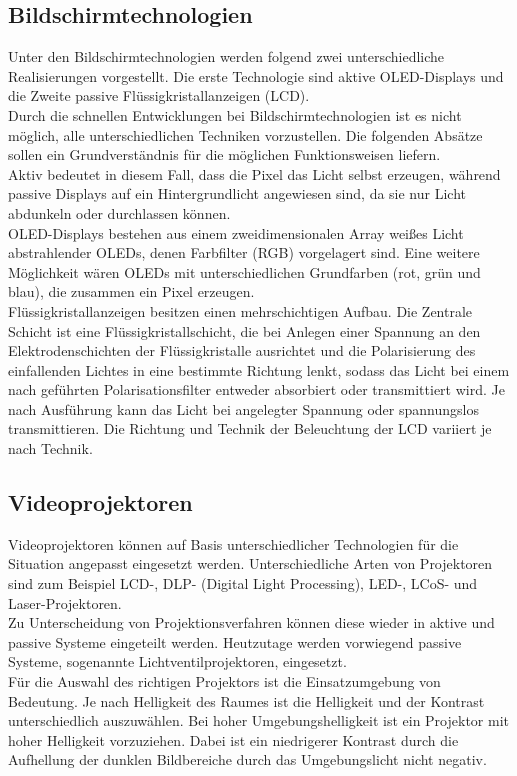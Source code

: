 \subsection{Bildschirmtechnologien}
Unter den Bildschirmtechnologien werden folgend zwei unterschiedliche Realisierungen vorgestellt. Die erste Technologie sind aktive OLED-Displays und die Zweite passive Flüssigkristallanzeigen (LCD). \\
Durch die schnellen Entwicklungen bei Bildschirmtechnologien ist es nicht möglich, alle unterschiedlichen Techniken vorzustellen. Die folgenden Absätze sollen ein Grundverständnis für die möglichen Funktionsweisen liefern.\\
Aktiv bedeutet in diesem Fall, dass die Pixel das Licht selbst erzeugen, während passive Displays auf ein Hintergrundlicht angewiesen sind, da sie nur Licht abdunkeln oder durchlassen können. \\
\glqq OLED-Displays bestehen aus einem zweidimensionalen Array weißes Licht abstrahlender OLEDs, denen Farbfilter (RGB) vorgelagert sind.\grqq \cite[Seite 347]{LofflerMang.2020} Eine weitere Möglichkeit wären OLEDs mit unterschiedlichen Grundfarben (rot, grün und blau), die zusammen ein Pixel erzeugen. \\
Flüssigkristallanzeigen besitzen einen mehrschichtigen Aufbau. Die Zentrale Schicht ist eine Flüssigkristallschicht, die bei Anlegen einer Spannung an den Elektrodenschichten der Flüssigkristalle ausrichtet und die Polarisierung des einfallenden Lichtes in eine bestimmte Richtung lenkt, sodass das Licht bei einem nach geführten Polarisationsfilter entweder absorbiert oder transmittiert wird. \cite[][Vgl. Seite 346 f.]{LofflerMang.2020} Je nach Ausführung kann das Licht bei angelegter Spannung oder spannungslos transmittieren. Die Richtung und Technik der Beleuchtung der LCD variiert je nach Technik.
\subsection{Videoprojektoren}
Videoprojektoren können auf Basis unterschiedlicher Technologien für die Situation angepasst eingesetzt werden. Unterschiedliche Arten von Projektoren sind zum Beispiel LCD-, DLP- (Digital Light Processing), LED-, LCoS- und Laser-Projektoren. \\
Zu Unterscheidung von Projektionsverfahren können diese wieder in aktive und passive Systeme eingeteilt werden. Heutzutage werden vorwiegend passive Systeme, sogenannte Lichtventilprojektoren, eingesetzt. \cite[Vgl. Seite 551]{Schmidt.2021} \\
Für die Auswahl des richtigen Projektors ist die Einsatzumgebung von Bedeutung. Je nach Helligkeit des Raumes ist die Helligkeit und der Kontrast unterschiedlich auszuwählen. Bei hoher Umgebungshelligkeit ist ein Projektor mit hoher Helligkeit vorzuziehen. Dabei ist ein niedrigerer Kontrast durch die Aufhellung der dunklen Bildbereiche durch das Umgebungslicht nicht negativ. \cite[Vgl. Seite 562]{Schmidt.2021}
